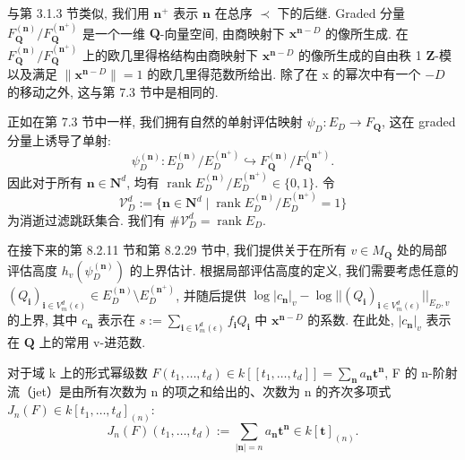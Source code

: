 与第 3.1.3 节类似, 我们用 \(\mathbf{n}^+\) 表示 \(\mathbf{n}\) 在总序 \(\prec\) 下的后继. 
Graded 分量 \(F_{\mathbf{Q}}^{(\mathbf{n})}/F_{\mathbf{Q}}^{(\mathbf{n}^+)}\) 是一个一维 \(\mathbf{Q}\)-向量空间, 
由商映射下 \(\mathbf{x}^{\mathbf{n}-D}\) 的像所生成. 
在 \(F_{\mathbf{Q}}^{(\mathbf{n})}/F_{\mathbf{Q}}^{(\mathbf{n}^+)}\) 上的欧几里得格结构由商映射下 \(\mathbf{x}^{\mathbf{n}-D}\) 
的像所生成的自由秩 1 \(\mathbf{Z}\)-模以及满足 \(\|\mathbf{x}^{\mathbf{n}-D}\| = 1\) 的欧几里得范数所给出. 
除了在 x 的幂次中有一个 \(-D\) 的移动之外, 这与第 7.3 节中是相同的.

正如在第 7.3 节中一样, 我们拥有自然的单射评估映射 \(\psi_D: E_D \to F_{\mathbf{Q}}\), 
这在 graded 分量上诱导了单射:
\[ \psi_D^{(\mathbf{n})}: E_D^{(\mathbf{n})}/E_D^{(\mathbf{n}^+)} \hookrightarrow F_{\mathbf{Q}}^{(\mathbf{n})}/F_{\mathbf{Q}}^{(\mathbf{n}^+)}. \]
因此对于所有 \(\mathbf{n} \in \mathbf{N}^d\), 
均有 \(\operatorname{rank} E_D^{(\mathbf{n})}/E_D^{(\mathbf{n}^+)} \in \{0,1\}\). 
令
\[ \mathcal{V}_D^d := \{ \mathbf{n} \in \mathbf{N}^d \mid \operatorname{rank} E_D^{(\mathbf{n})} / E_D^{(\mathbf{n}^+)} = 1 \} \]
为消逝过滤跳跃集合. 我们有 \(\#\mathcal{V}_D^d = \operatorname{rank} E_D\).

在接下来的第 8.2.11 节和第 8.2.29 节中, 我们提供关于在所有 \(v \in M_{\mathbf{Q}}\) 处的局部评估高度 \(h_v(\psi_D^{(\mathbf{n})})\) 的上界估计. 
根据局部评估高度的定义, 我们需要考虑任意的 \((Q_{\mathbf{i}})_{\mathbf{i} \in V_m^d(\epsilon)} \in E_D^{(\mathbf{n})} \setminus E_D^{(\mathbf{n}^+)}\), 
并随后提供 \(\log |c_{\mathbf{n}}|_v - \log ||(Q_{\mathbf{i}})_{\mathbf{i} \in V_m^d(\epsilon)}||_{E_D,v}\) 的上界, 
其中 \(c_{\mathbf{n}}\) 表示在 \(s := \sum_{\mathbf{i} \in V_m^d(\epsilon)} f_{\mathbf{i}}Q_{\mathbf{i}}\) 中 \(\mathbf{x}^{\mathbf{n}-D}\) 的系数. 
在此处, \(|c_{\mathbf{n}}|_v\) 表示在 \(\mathbf{Q}\) 上的常用 v-进范数.

\begin{definition}\label{def:8.2.9}
对于域 k 上的形式幂级数 \(F(t_1, \ldots, t_d) \in k[\![t_1, \ldots, t_d]\!] = \sum_{\mathbf{n}} a_{\mathbf{n}} \mathbf{t}^{\mathbf{n}}\), 
F 的 n-阶射流（jet）是由所有次数为 n 的项之和给出的、次数为 n 的齐次多项式 \(J_n(F) \in k[t_1, \ldots, t_d]_{(n)}\):
\[ J_n(F)(t_1,\ldots,t_d) := \sum_{| \mathbf{n} | = n} a_{\mathbf{n}} \mathbf{t}^{\mathbf{n}} \in k[\mathbf{t}]_{(n)}. \]
\end{definition}

